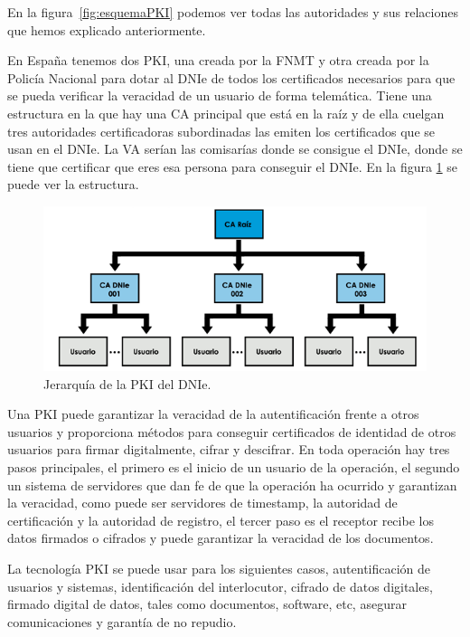 En la figura~\ref{fig:esquemaPKI} podemos ver todas las autoridades y sus relaciones que hemos explicado anteriormente.

En España tenemos dos PKI, una creada por la FNMT y otra creada por la Policía Nacional para dotar al DNIe de todos los certificados necesarios para que se pueda verificar la veracidad de un usuario de forma telemática. Tiene una estructura en la que hay una CA principal que está en la raíz y de ella cuelgan tres autoridades certificadoras subordinadas las emiten los certificados que se usan en el DNIe. La VA serían las comisarías donde se consigue el DNIe, donde se tiene que certificar que eres esa persona para conseguir el DNIe. En la figura \ref{fig:pkiDnie} se puede ver la estructura.

\begin{figure}
  \centering
    \includegraphics[scale=0.9]{./Criptografia/imagenes/pkiDnie.png}
  \caption{Jerarquía de la PKI del DNIe.}
  \label{fig:pkiDnie}
\end{figure} 

Una PKI puede garantizar la veracidad de la autentificación frente a otros usuarios y proporciona métodos para conseguir certificados de identidad de otros usuarios para firmar digitalmente, cifrar y descifrar. En toda operación hay tres pasos principales, el primero es el inicio de un usuario de la operación, el segundo un sistema de servidores que dan fe de que la operación ha ocurrido y garantizan la veracidad, como puede ser servidores de timestamp, la autoridad de certificación y la autoridad de registro, el tercer paso es el receptor recibe los datos firmados o cifrados y puede garantizar la veracidad de los documentos.

La tecnología PKI se puede usar para los siguientes casos, autentificación de usuarios y sistemas, identificación del interlocutor, cifrado de datos digitales, firmado digital de datos, tales como documentos, software, etc, asegurar comunicaciones y garantía de no repudio.

